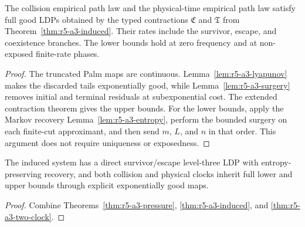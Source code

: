 \begin{theorem}
\label{thm:r5-a3-two-clock}
The collision empirical path law and the physical-time empirical path law
satisfy full good LDPs obtained by the typed contractions
\({\mathfrak C}\) and \({\mathfrak T}\) from
Theorem~\ref{thm:r5-a3-induced}.  Their rates include the survivor, escape,
and coexistence branches.  The lower bounds hold at zero frequency and at
non-exposed finite-rate phases.
\end{theorem}

\begin{proof}
The truncated Palm maps are continuous.  Lemma~\ref{lem:r5-a3-lyapunov}
makes the discarded tails exponentially good, while
Lemma~\ref{lem:r5-a3-surgery} removes initial and terminal residuals at
subexponential cost.  The extended contraction theorem gives the upper
bounds.  For the lower bounds, apply the Markov recovery
Lemma~\ref{lem:r5-a3-entropy}, perform the bounded surgery on each finite-cut
approximant, and then send \(m\), \(L\), and \(n\) in that order.  This
argument does not require uniqueness or exposedness.
\end{proof}

\begin{theorem}
\label{thm:r5-a3-main}
The induced system has a direct survivor/escape level-three LDP with
entropy-preserving recovery, and both collision and physical clocks inherit
full lower and upper bounds through explicit exponentially good maps.
\end{theorem}

\begin{proof}
Combine Theorems~\ref{thm:r5-a3-pressure},
\ref{thm:r5-a3-induced}, and
\ref{thm:r5-a3-two-clock}.
\end{proof}
